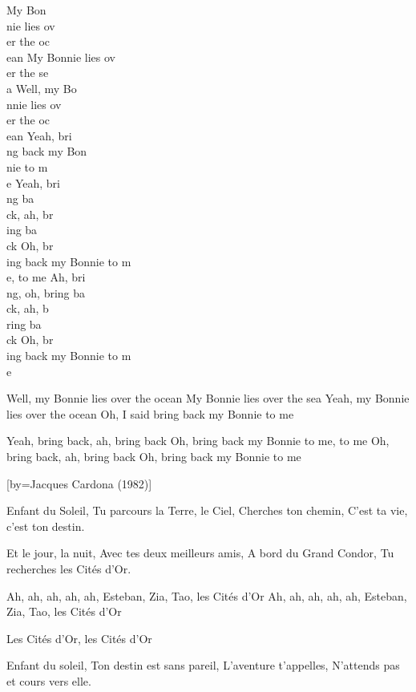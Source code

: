 \beginverse
My Bon\\[Sol]nie lies ov\\[Do]er the oc\\[Sol]ean
My Bonnie lies ov\\[la7]er the se\\[Ré7]a
Well, my Bo\\[Sol]nnie lies ov\\[Do]er the oc\\[Sol]ean
Yeah, bri\\[La7]ng back my Bon\\[Ré7]nie to m\\[Sol]e
Yeah, bri\\[Sol]ng ba\\[Sol7]ck, ah, br\\[Do]ing ba\\[La7]ck
Oh, br\\[Ré7]ing back my Bonnie to m\\[Sol]e, to me
Ah, bri\\[Sol]ng, oh, bring ba\\[Sol7]ck, ah, b\\[Do]ring ba\\[La7]ck
Oh, br\\[Ré7]ing back my Bonnie to m\\[Sol]e
\endverse

\beginverse
Well, my Bonnie lies over the ocean
My Bonnie lies over the sea
Yeah, my Bonnie lies over the ocean
Oh, I said bring back my Bonnie to me
\endverse

\beginverse
Yeah, bring back, ah, bring back
Oh, bring back my Bonnie to me, to me
Oh, bring back, ah, bring back
Oh, bring back my Bonnie to me
\endverse

[by={Jacques Cardona (1982)}]

\beginverse
Enfant du Soleil,
Tu parcours la Terre, le Ciel,
Cherches ton chemin,
C'est ta vie, c'est ton destin.
\endverse

\beginverse
Et le jour, la nuit,
Avec tes deux meilleurs amis,
A bord du Grand Condor,
Tu recherches les Cités d'Or.
\endverse

\beginverse
Ah, ah, ah, ah, ah,
Esteban, Zia, Tao, les Cités d'Or
Ah, ah, ah, ah, ah,
Esteban, Zia, Tao, les Cités d'Or
\endverse

\beginverse
Les Cités d'Or, les Cités d'Or
\endverse

\beginverse
Enfant du soleil,
Ton destin est sans pareil,
L'aventure t'appelles,
N'attends pas et cours vers elle.
\endverse

